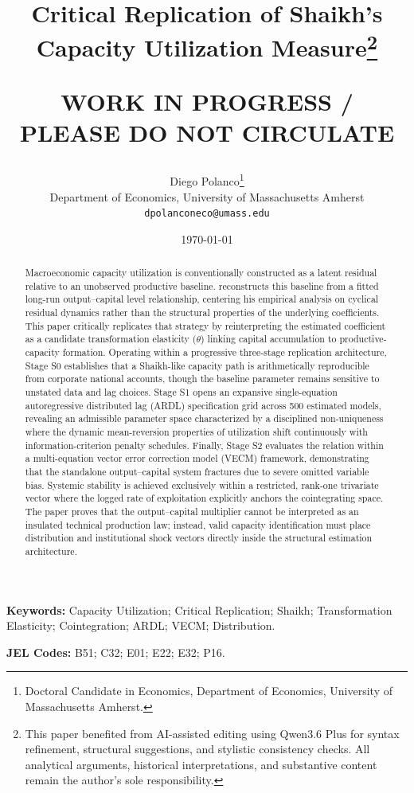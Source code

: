 \documentclass[11pt]{article}
\title{Critical Replication of Shaikh's Capacity Utilization Measure\thanks{This paper benefited from AI-assisted editing using Qwen3.6 Plus for syntax refinement, structural suggestions, and stylistic consistency checks. All analytical arguments, historical interpretations, and substantive content remain the author's sole responsibility.}\\
\begin{large}
\textbf{WORK IN PROGRESS / PLEASE DO NOT CIRCULATE}     
\end{large}
}
\author{Diego Polanco\thanks{Doctoral Candidate in Economics, Department of Economics, University of Massachusetts Amherst.}\\
Department of Economics, University of Massachusetts Amherst\\
\texttt{dpolanconeco@umass.edu}}
\date{\today}
\begin{document}
\maketitle


\begin{abstract}
Macroeconomic capacity utilization is conventionally constructed as a latent residual relative to an unobserved productive baseline. \citet{Shaikh2016} reconstructs this baseline from a fitted long-run output--capital level relationship, centering his empirical analysis on cyclical residual dynamics rather than the structural properties of the underlying coefficients. This paper critically replicates that strategy by reinterpreting the estimated coefficient as a candidate transformation elasticity ($\theta$) linking capital accumulation to productive-capacity formation. Operating within a progressive three-stage replication architecture, Stage S0 establishes that a Shaikh-like capacity path is arithmetically reproducible from corporate national accounts, though the baseline parameter remains sensitive to unstated data and lag choices. Stage S1 opens an expansive single-equation autoregressive distributed lag (ARDL) specification grid across 500 estimated models, revealing an admissible parameter space characterized by a disciplined non-uniqueness where the dynamic mean-reversion properties of utilization shift continuously with information-criterion penalty schedules. Finally, Stage S2 evaluates the relation within a multi-equation vector error correction model (VECM) framework, demonstrating that the standalone output--capital system fractures due to severe omitted variable bias. Systemic stability is achieved exclusively within a restricted, rank-one trivariate vector where the logged rate of exploitation explicitly anchors the cointegrating space. The paper proves that the output--capital multiplier cannot be interpreted as an insulated technical production law; instead, valid capacity identification must place distribution and institutional shock vectors directly inside the structural estimation architecture.
\end{abstract}


\vspace{1cm}

\noindent\textbf{Keywords:} Capacity Utilization; Critical Replication; Shaikh; Transformation Elasticity; Cointegration; ARDL; VECM; Distribution.

\noindent\textbf{JEL Codes:} B51; C32; E01; E22; E32; P16.

\pagebreak
\end{document}
